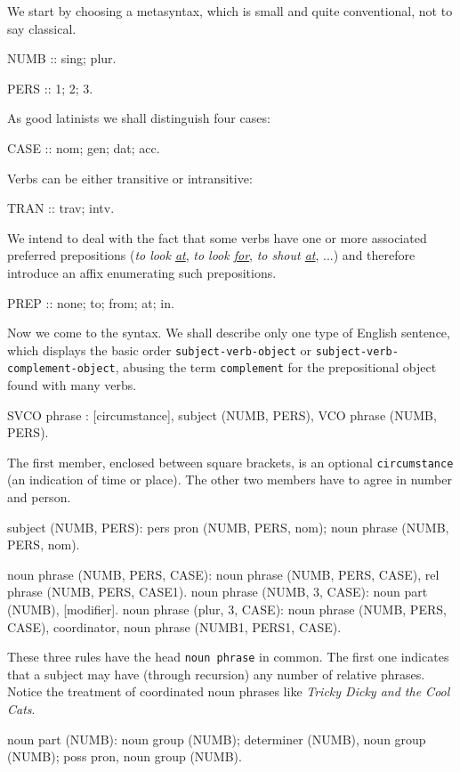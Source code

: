 We start by choosing a metasyntax, which is small and quite conventional,
not to say classical.
\begin{elan}
NUMB :: sing; plur.
\end{elan}
\begin{elan}
PERS :: 1; 2; 3.
\end{elan}
As good latinists we shall distinguish four cases:
\begin{elan}
CASE :: nom; gen; dat; acc.
\end{elan}
Verbs can be either transitive or intransitive:
\begin{elan}
TRAN :: trav; intv.
\end{elan}
We intend to deal with the fact that some verbs have one or more
associated preferred prepositions ({\sl to look \underline{at}}, {\sl to look
\underline{for}}, {\sl to shout \underline{at}}, ...) and therefore introduce
an affix enumerating such prepositions.
\begin{elan}
PREP :: none; to; from; at; in.
\end{elan}
Now we come to the syntax. We shall describe only one type of English
sentence, which displays the basic order {\tt subject-verb-object}
or {\tt subject-verb-comple\-ment-ob\-ject}, abusing the term {\tt complement}
for the prepositional object found with many verbs.
\begin{elan}
SVCO phrase :
  [circumstance], subject (NUMB, PERS), VCO phrase (NUMB, PERS).
\end{elan}
The first member, enclosed between square brackets, is an optional
{\tt circumstance} (an indication of time or place). The other two
members have to agree in number and person.
\begin{elan}
subject (NUMB, PERS):
  pers pron (NUMB, PERS, nom);
  noun phrase (NUMB, PERS, nom).
\end{elan}
\begin{elan}
noun phrase (NUMB, PERS, CASE):
  noun phrase (NUMB, PERS, CASE), rel phrase (NUMB, PERS, CASE1).
noun phrase (NUMB, 3, CASE):
  noun part (NUMB), [modifier].
noun phrase (plur, 3, CASE):
  noun phrase (NUMB, PERS, CASE),
     coordinator, noun phrase (NUMB1, PERS1, CASE).
\end{elan}
These three rules have the head {\tt noun phrase} in common. The first one
indicates that a subject may have (through recursion) any number of
relative phrases. Notice the treatment of coordinated noun phrases
like {\sl Tricky Dicky and the Cool Cats}.
\begin{elan}
noun part (NUMB):
  noun group (NUMB);
  determiner (NUMB), noun group (NUMB);
  poss pron, noun group (NUMB).
\end{elan}
